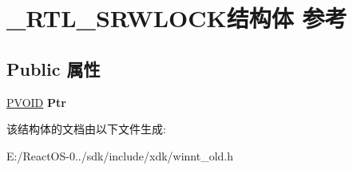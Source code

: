 \hypertarget{struct___r_t_l___s_r_w_l_o_c_k}{}\section{\+\_\+\+R\+T\+L\+\_\+\+S\+R\+W\+L\+O\+C\+K结构体 参考}
\label{struct___r_t_l___s_r_w_l_o_c_k}
\subsection*{Public 属性}
\begin{DoxyCompactItemize}
\item 
\mbox{\label{struct___r_t_l___s_r_w_l_o_c_k_aa2765cf163f61de685cebcab8d8914c2}} 
\hyperlink{interfacevoid}{P\+V\+O\+ID} {\bfseries Ptr}
\end{DoxyCompactItemize}


该结构体的文档由以下文件生成\+:\begin{DoxyCompactItemize}
\item 
E\+:/\+React\+O\+S-\/0../sdk/include/xdk/winnt\+\_\+old.\+h\end{DoxyCompactItemize}
